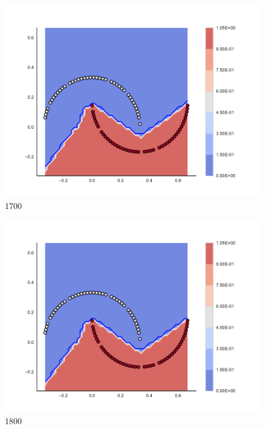 \begin{subfigure}[b]{0.09\textwidth}
    \includegraphics[clip, trim=2.35cm 1.75cm 4.5cm 0cm,width=\textwidth]{img/convergence/1700.pdf}
    \caption{1700}
    \label{fig:convergence_1700}
\end{subfigure}
%
\begin{subfigure}[b]{0.09\textwidth}
    \includegraphics[clip, trim=2.35cm 1.75cm 4.5cm 0cm,width=\textwidth]{img/convergence/1800.pdf}
    \caption{1800}
    \label{fig:convergence_1800}
\end{subfigure}
%
